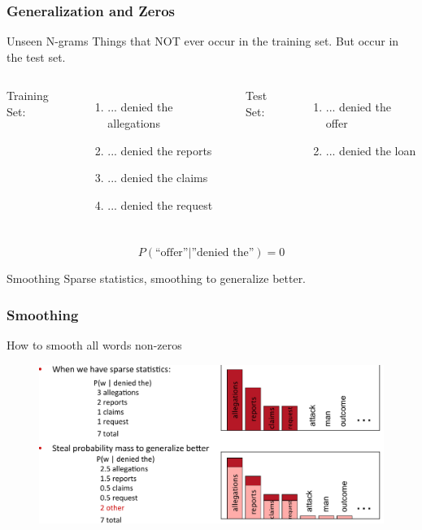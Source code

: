 \documentclass{beamer}
\begin{document}
\begin{frame}\frametitle{Generalization and Zeros}

\begin{block}{Unseen N-grams}
Things that NOT ever occur in the training set. But occur in the test
set. 

\end{block}

\begin{columns}[t] %
Training Set:
\begin{enumerate}
\item ... denied the allegations
\item ... denied the reports
\item ... denied the claims
\item ... denied the request
\end{enumerate}

Test Set:
\begin{enumerate}
\item ... denied the offer
\item ... denied the loan
\end{enumerate}
\end{columns}
$$
P(\text{``offer''}|\text{''denied the''}) = 0
$$

\begin{block}{Smoothing}
Sparse statistics, smoothing to generalize better.
\end{block}
\end{frame}


\begin{frame}\frametitle{Smoothing}

\begin{block}{How to smooth all words non-zeros}

\begin{figure}
\includegraphics[width=0.9\linewidth]{figure/smoothing.pdf}
\label{fig:smoothing}
\end{figure}
\end{block}
\end{frame}
\end{document}
